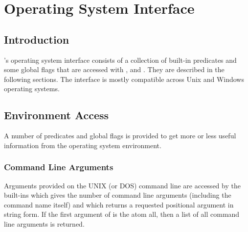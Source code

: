 %
%
%
%
%
%
%
%
%
%
\chapter{Operating System Interface}
\label{chapopsys}

\section{Introduction}

{\eclipse}'s operating system interface consists of a collection of built-in
predicates and some global flags that are accessed with
,
 and
. They are described in the
following sections.
The interface is mostly compatible across Unix and Windows operating systems.

\section{Environment Access}
A number of predicates and global flags is provided to get more or less
useful information from the operating system environment.
\subsection{Command Line Arguments}
Arguments provided on the UNIX (or DOS) command line are accessed by the
built-ins
 which gives the number of
command line arguments (including
the command name itself) and 
which returns a requested positional
argument in string form. If the first argument of  is the atom
all, then a list of all command line arguments is returned.

